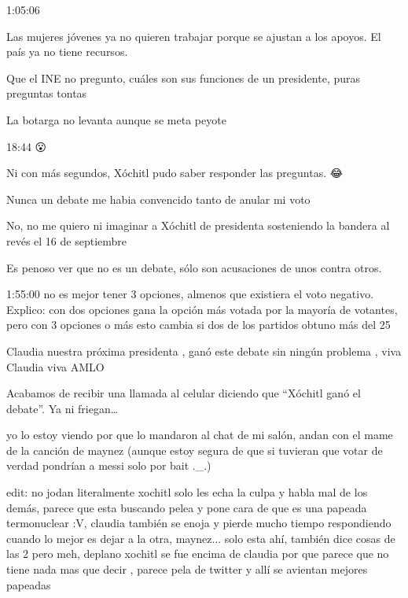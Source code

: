 1:05:06

Las mujeres jóvenes ya no quieren trabajar porque se ajustan a los apoyos. El país ya no tiene recursos.

Que el INE no pregunto, cuáles son sus funciones de un presidente, puras preguntas tontas

La botarga no levanta aunque se meta peyote 🤣🤣🤣

18:44 😮

Ni con más segundos, Xóchitl pudo saber responder las preguntas. 😂

Nunca un debate me habia convencido tanto de anular mi voto 🥴

No, no  me quiero ni imaginar a Xóchitl de presidenta  sosteniendo  la bandera al revés el 16 de septiembre

Es penoso ver que no es un debate, sólo son acusaciones de unos contra otros.

1:55:00 no es mejor tener 3 opciones, almenos que existiera el voto negativo. Explico: con dos opciones gana la opción más votada por la mayoría de votantes, pero con 3 opciones o más esto cambia si dos de los partidos obtuno más del 25%

Claudia nuestra próxima presidenta , ganó este debate sin ningún problema , viva Claudia viva AMLO

Acabamos de recibir una llamada al celular diciendo que “Xóchitl ganó el debate”.  Ya ni friegan…

yo lo estoy viendo por que lo mandaron al chat de mi salón, andan con el mame de la canción de maynez (aunque estoy segura de que si tuvieran que votar de verdad pondrían a messi solo por bait ._.)

edit: no jodan literalmente xochitl solo les echa la culpa y habla mal de los demás, parece que esta buscando pelea y pone cara de que es una papeada termonuclear :V, claudia también se enoja y pierde mucho tiempo respondiendo cuando lo mejor es dejar a la otra, maynez... solo esta ahí, también dice cosas de las 2 pero meh, deplano xochitl se fue encima de claudia por que parece que no tiene nada mas que decir , parece pela de twitter y allí se avientan mejores papeadas

